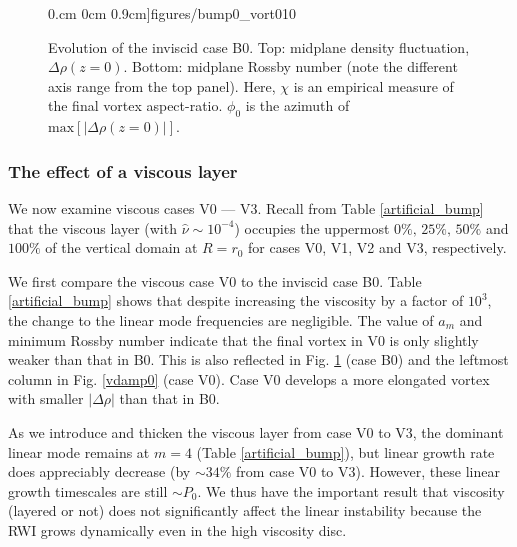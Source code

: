 \begin{figure}
     0.cm 0cm
     0.9cm]{figures/bump0_vort010}
  \caption{Evolution of the inviscid case B0. Top: midplane density fluctuation, 
    $\Delta\rho(z=0)$. Bottom: midplane
    Rossby number (note the different axis range from the top panel). 
    Here, $\chi$ is an empirical measure of the final vortex
    aspect-ratio. $\phi_0$ is the azimuth of 
    $\mathrm{max}\left[|\Delta\rho(z=0)|\right]$.
    \label{bump0_bump1}}
\end{figure}

\subsubsection{The effect of a viscous layer}
We now examine viscous cases V0 --- V3. Recall  
from Table \ref{artificial_bump} that the viscous layer (with $
\hat{\nu}\sim10^{-4}$) occupies the uppermost $0\%,\,25\%,\,50\%$ and
$100\%$ of the vertical domain at $R=r_0$ for cases V0, V1, V2 and V3,
respectively.     

We first compare the viscous case V0 to the 
inviscid case B0. Table \ref{artificial_bump} shows that despite
increasing the viscosity by a factor of $10^3$, the change to the
linear mode frequencies are negligible. 
The value of $a_m$ and minimum Rossby number indicate that the final
vortex in V0 is only slightly weaker than that in B0. This is also
reflected in  Fig. \ref{bump0_bump1} (case B0) and the leftmost column in
Fig. \ref{vdamp0} (case V0). Case V0 develops a more elongated 
vortex with smaller $|\Delta\rho|$ than that in B0. 
  
As we introduce and thicken the viscous layer from case V0 to V3, the dominant
linear mode remains at $m=4$ (Table \ref{artificial_bump}), but linear
growth rate does appreciably decrease (by $\sim 34\%$ from case V0 to
V3). However, these linear growth timescales  
are still $\sim P_0$. We thus have the important result that
viscosity (layered or not) does not significantly affect the linear
instability because the RWI grows dynamically even in the high
viscosity disc.     
 
